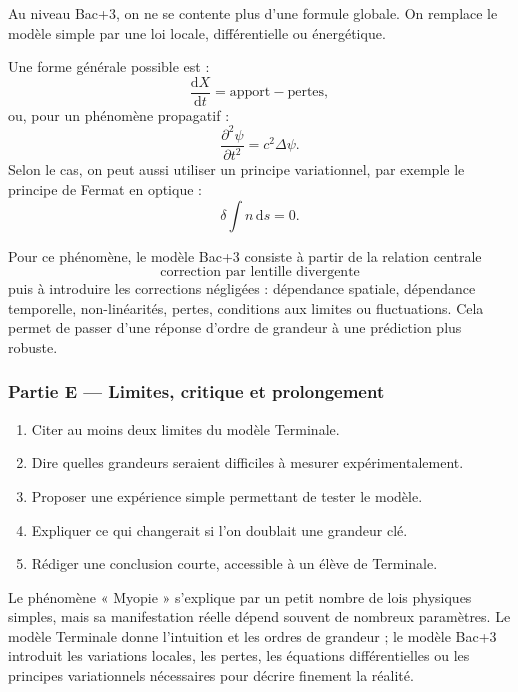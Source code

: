 \documentclass[11pt,a4paper]{article}
\begin{document}
\begin{approfondissementbox}
Au niveau Bac+3, on ne se contente plus d'une formule globale. On remplace le modèle simple par une loi locale, différentielle ou énergétique.

Une forme générale possible est :
\[
\frac{\mathrm d X}{\mathrm dt}=\text{apport}-\text{pertes},
\]
ou, pour un phénomène propagatif :
\[
\frac{\partial^2 \psi}{\partial t^2}=c^2\Delta\psi.
\]
Selon le cas, on peut aussi utiliser un principe variationnel, par exemple le principe de Fermat en optique :
\[
\delta \int n\,\mathrm ds=0.
\]

Pour ce phénomène, le modèle Bac+3 consiste à partir de la relation centrale
\[
\text{correction par lentille divergente}
\]
puis à introduire les corrections négligées : dépendance spatiale, dépendance temporelle, non-linéarités, pertes, conditions aux limites ou fluctuations. Cela permet de passer d'une réponse d'ordre de grandeur à une prédiction plus robuste.
\end{approfondissementbox}

\subsubsection*{Partie E — Limites, critique et prolongement}

\begin{enumerate}
  \item Citer au moins deux limites du modèle Terminale.
  \item Dire quelles grandeurs seraient difficiles à mesurer expérimentalement.
  \item Proposer une expérience simple permettant de tester le modèle.
  \item Expliquer ce qui changerait si l'on doublait une grandeur clé.
  \item Rédiger une conclusion courte, accessible à un élève de Terminale.
\end{enumerate}

\begin{corrigebox}
Le phénomène « Myopie » s'explique par un petit nombre de lois physiques simples, mais sa manifestation réelle dépend souvent de nombreux paramètres. Le modèle Terminale donne l'intuition et les ordres de grandeur ; le modèle Bac+3 introduit les variations locales, les pertes, les équations différentielles ou les principes variationnels nécessaires pour décrire finement la réalité.
\end{corrigebox}
\end{document}

